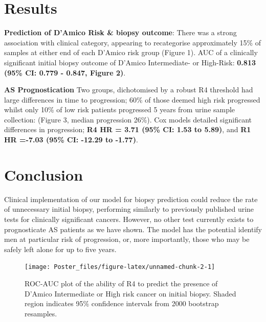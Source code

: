 \documentclass[article,30pt,extrafontsizes]{memoir}
\begin{document}
\begin{adjmulticols*}{2}{10mm}{10mm}
{\hypertarget{results}{%
\section{Results}\label{results}}

\vspace{-7.5mm}

\textbf{Prediction of D'Amico Risk \& biopsy outcome}: There was a
strong association with clinical category, appearing to recategorise
approximately 15\% of samples at either end of each D'Amico risk group
(Figure 1). AUC of a clinically significant initial biopsy outcome of
D'Amico Intermediate- or High-Risk: \textbf{0.813 (95\% CI: 0.779 -
0.847, Figure 2)}.

\textbf{AS Prognostication} Two groups, dichotomised by a robust R4
threshold had large differences in time to progression; 60\% of those
deemed high risk progressed whilst only 10\% of low risk patients
progressed 5 years from urine sample collection: (Figure 3, median
progression 26\%). Cox models detailed significant differences in
progression; \textbf{R4 HR = 3.71 (95\% CI: 1.53 to 5.89)}, and
\textbf{R1 HR =-7.03 (95\% CI: -12.29 to -1.77)}. \vspace{-28.5mm}

\hypertarget{conclusion}{%
\section{Conclusion}\label{conclusion}}

\vspace{-7.5mm}

Clinical implementation of our model for biopsy prediction could reduce
the rate of unnecessary initial biopsy, performing similarly to
previously published urine tests for clinically significant cancers.
However, no other test currently exists to prognosticate AS patients as
we have shown. The model has the potential identify men at particular
risk of progression, or, more importantly, those who may be safely left
alone for up to five years.\\

\begin{figure}

{\centering \texttt{[image: Poster\_files/figure-latex/unnamed-chunk-2-1]} 

}

\caption{ROC-AUC plot of the ability of R4 to predict the presence of D'Amico Intermediate or High risk cancer on initial biopsy. Shaded region indicates 95\% confidence intervals from 2000 bootstrap resamples.}\label{fig:unnamed-chunk-2}
\end{figure}
\vspace{-10mm}

}
\end{adjmulticols*}
\end{document}
